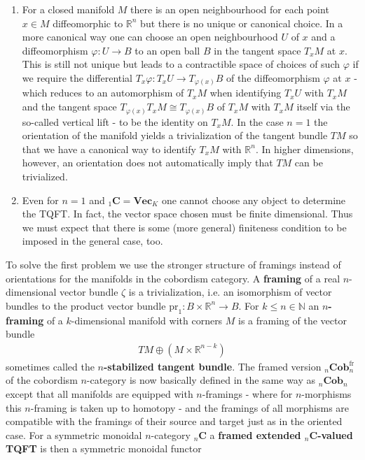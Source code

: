 \begin{enumerate}
\item
For a closed manifold $M$ there is an open neighbourhood for each point $x \in M$ diffeomorphic to $\mathbb{R}^{n}$ but there is no unique or canonical choice. In a more canonical way one can choose an open neighbourhood $U$ of $x$ and a diffeomorphism $\varphi \colon U \to B$ to an open ball $B$ in the tangent space $T_{x}M$ at $x$. This is still not unique but leads to a contractible space of choices of such $\varphi$ if we require the differential $T_{x}\varphi \colon T_{x}U \to T_{\varphi(x)}B$ of the diffeomorphism $\varphi$ at $x$ - which reduces to an automorphism of $T_{x}M$ when identifying $T_{x}U$ with $T_{x}M$ and the tangent space $T_{\varphi(x)}T_{x}M \cong T_{\varphi(x)}B$ of $T_{x}M$ with $T_{x}M$ itself via the so-called vertical lift - to be the identity on $T_{x}M$. In the case $n = 1$ the orientation of the manifold yields a trivialization of the tangent bundle $TM$ so that we have a canonical way to identify $T_{x}M$ with $\mathbb{R}^{n}$. In higher dimensions, however, an orientation does not automatically imply that $TM$ can be trivialized.

\item
Even for $n = 1$ and ${_{1}}\mathbf{C} = \mathbf{Vec}_{K}$ one cannot choose any object to determine the TQFT. In fact, the vector space chosen must be finite dimensional. Thus we must expect that there is some (more general) finiteness condition to be imposed in the general case, too.
\end{enumerate}
To solve the first problem we use the stronger structure of framings instead of orientations for the manifolds in the cobordism category. A \textbf{framing} of a real $n$-dimensional vector bundle $\zeta$ is a trivialization, i.e. an isomorphism of vector bundles to the product vector bundle $\mathrm{pr}_{1} \colon B \times \mathbb{R}^{n} \to B$. For $k \leq n \in \mathbb{N}$ an \textbf{$n$-framing} of a $k$-dimensional manifold with corners $M$ is a framing of the vector bundle
\begin{align*}
  TM
  \oplus
  \left(
    M
    \times
    \mathbb{R}^{n-k}
  \right)
\end{align*}
sometimes called the \textbf{$n$-stabilized tangent bundle}. The framed version ${_{n}}\mathbf{Cob}_{n}^{\mathrm{fr}}$ of the cobordism $n$-category is now basically defined in the same way as ${_{n}}\mathbf{Cob}_{n}$ except that all manifolds are equipped with $n$-framings - where for $n$-morphisms this $n$-framing is taken up to homotopy - and the framings of all morphisms are compatible with the framings of their source and target just as in the oriented case. For a symmetric monoidal $n$-category ${_{n}}\mathbf{C}$ a \textbf{framed extended ${_{n}}\mathbf{C}$-valued TQFT} is then a symmetric monoidal functor
